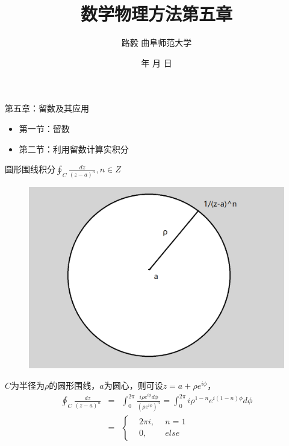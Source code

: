 \documentclass[11pt]{beamer}
\begin{document}
	\author{ 路毅 \hspace{0.3cm} 曲阜师范大学 }
	\date{\number\year 年 \number\month 月 \number\day 日}
	\title{数学物理方法第五章}

\begin{frame}
	\maketitle
\end{frame}

\kaishu

\begin{frame}{第五章：留数及其应用}
\begin{itemize}
	\item 第一节：留数
	\vspace{1cm}
	\item 第二节：利用留数计算实积分
\end{itemize}
\end{frame}

\begin{frame}{ 圆形围线积分$\oint_C \frac{dz}{(z-a)^n}, n \in Z$ }

\begin{figure}
\centering
\includegraphics[width=0.4\linewidth]{chap5page1}
\label{fig:chap5page1}
\end{figure}

$C$为半径为$\rho$的圆形围线，$a$为圆心，则可设$z = a + \rho e^{i \phi}$，
\begin{eqnarray}
\oint_C \frac{dz}{(z-a)^n} &=& \int^{2\pi}_0 \frac{i\rho e^{i\phi} d\phi }{(\rho e^{i \phi})^n}
= \int^{2\pi}_0 i \rho^{1-n} e^{i(1-n)\phi} d\phi
\nonumber\\
&=& \left\{
\begin{aligned}
& 2\pi i, ~~ & n=1 \\
& 0, ~~ & else
\end{aligned}
\right.
\end{eqnarray}

\end{frame}
\end{document}
